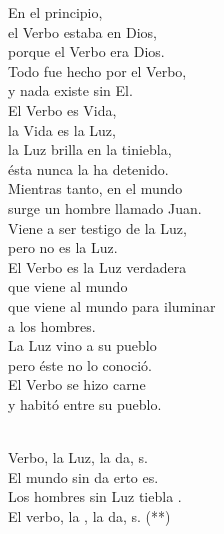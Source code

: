 \begin{cancion}%
En el principio,\\
el Verbo estaba en Dios,\\
porque el Verbo era Dios.\\
Todo fue hecho por el Verbo,\\
y nada existe sin El.\\
El Verbo es Vida,\\
la Vida es la Luz,\\
la Luz brilla en la tiniebla,\\
ésta nunca la ha detenido.\\
Mientras tanto, en el mundo\\
surge un hombre llamado Juan.\\
Viene a ser testigo de la Luz,\\
pero no es la Luz.\\
El Verbo es la Luz verdadera\\
que viene al mundo\\
que viene al mundo para iluminar\\
a los hombres.\\
La Luz vino a su pueblo\\
pero éste no lo conoció.\\
El Verbo se hizo carne\\
y habitó entre su pueblo.\\\jump\\
	\begin{chorus}%
	Verbo, la Luz, la da, s.\\
	El mundo sin da erto es.\\
	Los hombres sin Luz tiebla .\\
	El verbo, la , la da, s. (**)\\
	\end{chorus}%
	\jump\\
\end{cancion}%

